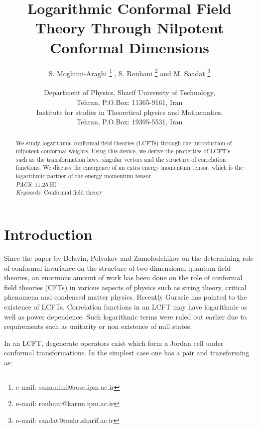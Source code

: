 \documentclass[a4paper,11pt]{article}
\begin{document}
\title{Logarithmic Conformal Field Theory Through Nilpotent Conformal Dimensions}
\author{S. Moghimi-Araghi \footnote{e-mail: samanimi@rose.ipm.ac.ir} ,
S. Rouhani \footnote{e-mail: rouhani@karun.ipm.ac.ir} and M.
Saadat \footnote{e-mail: saadat@mehr.sharif.ac.ir}\\
\\
Department of Physics, Sharif University of Technology,\\ Tehran,
P.O.Box: 11365-9161, Iran\\ Institute for studies in Theoretical
physics and Mathematics,\\ Tehran, P.O.Box: 19395-5531, Iran}
\maketitle
\begin{abstract}
We study logarithmic conformal field theories (LCFTs) through the
introduction of nilpotent conformal weights. Using this device, we
derive the properties of LCFT's such as the transformation laws,
singular vectors and the structure of correlation functions. We
discuss the emergence of an extra energy momentum tensor, which
is the logarithmic partner of the energy momentum tensor.
\vspace{5mm}\\
{\it PACS}: 11.25.Hf \\
{\it Keywords}: Conformal field theory
\end{abstract}
\section{Introduction}
Since the paper by Belavin, Polyakov and Zamolodchikov \cite{BPZ}
on the determining role of conformal invariance on the structure
of two dimensional quantum field theories, an enormous amount of
work has been done on the role of conformal field theories (CFTs)
in various aspects of physics such as string theory, critical
phenomena and condensed matter physics. Recently Gurarie
\cite{Gur} has pointed to the existence of LCFTs. Correlation
functions in an LCFT may have logarithmic as well as power
dependence. Such logarithmic terms were ruled out earlier due to
requirements such as unitarity or non existence of null states.

In an LCFT, degenerate operators exist which form a Jordan cell
under conformal transformations. In the simplest case one has a
pair \myHighlight{$\phi$}\coordHE{} and \myHighlight{$\psi$}\coordHE{} transforming as:
\end{document}
